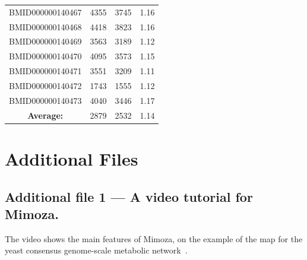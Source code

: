 \documentclass{bmcart}
\begin{document}
\begin{backmatter}
\begin{center}
\begin{longtable}{c|c|c|c}
BMID000000140467 & 4355 & 3745 & 1.16 \\
BMID000000140468 & 4418 & 3823 & 1.16 \\
BMID000000140469 & 3563 & 3189 & 1.12 \\
BMID000000140470 & 4095 & 3573 & 1.15 \\
BMID000000140471 & 3551 & 3209 & 1.11 \\
BMID000000140472 & 1743 & 1555 & 1.12 \\
BMID000000140473 & 4040 & 3446 & 1.17 \\
 \hline
\textbf{Average:} & 2879 & 2532 & 1.14 \\
\hline
\end{longtable}
\end{center}


\section*{Additional Files}
  \subsection*{Additional file 1 --- A video tutorial for Mimoza.}
  The video shows the main features of Mimoza, on the example of the map for the yeast consensus genome-scale metabolic network~\cite{Herrgard2008}.


\end{backmatter}
\end{document}
